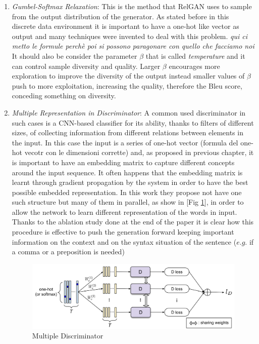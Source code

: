 \begin{enumerate}
	\item \textit{Gumbel-Softmax Relaxation}: This is the method that RelGAN uses to sample from the output distribution of the generator. As stated before in this discrete data environment it is important to have a one-hot like vector as output and many techniques were invented to deal with this problem. \textit{qui ci metto le formule perchè poi si possono paragonare con quello che facciamo noi}\\
	It should also be consider the parameter $\beta$ that is called \textit{temperature} and it can control sample diversity and quality. Larger $\beta$ encourages more exploration to improve the diversity of the output instead smaller values of $\beta$ push to more exploitation, increasing the quality, therefore the Bleu score, conceding something on diversity. 
	\item \textit{Multiple Representation in Discriminator}: A common used discriminator in such cases is a CNN-based classifier for its ability, thanks to filters of different sizes, of collecting information from different relations between elements in the input. In this case the input is a series of one-hot vector (formula del one-hot vecotr con le dimensioni corrette) and, as proposed in previous chapter, it is important to have an embedding matrix to capture different concepts around the input sequence. It often happens that the embedding matrix is learnt through gradient propagation by the system in order to have the best possible embedded representation. In this work they propose not have one such structure but many of them in parallel, as show in [Fig \ref{img:MultipleDiscriminator}], in order to allow the network to learn different representation of the words in input. Thanks to the ablation study done at the end of the paper it is clear how this procedure is effective to push the generation forward keeping important information on the context and on the syntax situation of the sentence ($e.g.$ if a comma or a preposition is needed)
		
	\begin{figure}[h!]
		\centering
		\includegraphics[width=0.8\linewidth]{Images/MultipleDiscriminator.png}
		\caption{Multiple Discriminator}
		\label{img:MultipleDiscriminator}
	\end{figure}
\end{enumerate}

